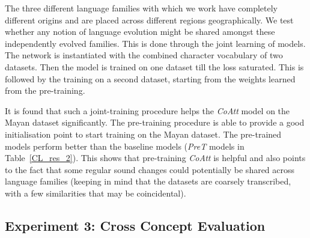 \documentclass[11pt,letterpaper]{article}
\begin{document}
The three different language families with which we work have completely different origins and are placed across different regions geographically. We test whether any notion of language evolution might be shared amongst these independently evolved families. This is done through the joint learning of models. The network is instantiated with the combined character vocabulary of two datasets. Then the model is trained on one dataset till the loss saturated. This is followed by the training on a second dataset, starting from the weights learned from the pre-training. 

It is found that such a joint-training procedure helps the \textit{CoAtt} model on the Mayan dataset significantly. The pre-training procedure is able to provide a good initialisation point to start training on the Mayan dataset. The pre-trained models perform better than the baseline models (\textit{PreT} models in Table~\ref{CL_res_2}). This shows that pre-training \textit{CoAtt} is helpful and also points to the fact that some regular sound changes could potentially be shared across language families (keeping in mind that the datasets are coarsely transcribed, with a few similarities that may be coincidental). 


\subsection{Experiment 3: Cross Concept Evaluation}
\end{document}
